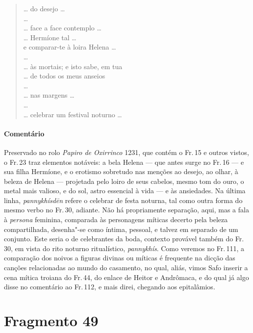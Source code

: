 \begin{verse}
\ldots{} do desejo \ldots{}\\
\ldots{}\\
\ldots{} face a face contemplo \ldots{}\\
\ldots{} Hermíone tal \ldots{}\\
e comparar-te à loira Helena \ldots{}\\
\ldots{}\\
\ldots{} às mortais; e isto sabe, em tua\\
\ldots{} de todos os meus anseios\\
\ldots{}\\
\ldots{} nas margens \ldots{}\\
\ldots{}\\
\ldots{} celebrar um festival noturno \ldots{} 
\end{verse}



{\paragraph{Comentário} Preservado no rolo \emph{Papiro de Oxirrinco} 1231, que contém o Fr.\,15 e outros vistos, o Fr.\,23 traz elementos notáveis: a bela Helena --- que antes surge no Fr.\,16 --- e sua filha Hermíone, e o erotismo sobretudo nas menções ao desejo, ao olhar, à beleza de Helena --- projetada pelo loiro de seus cabelos, mesmo tom do ouro, o metal mais valioso, e do sol, astro essencial à vida --- e às ansiedades. Na última linha, \emph{pannykhísdēn} refere o celebrar de festa noturna, tal como outra forma do mesmo verbo no Fr.\,30, adiante. Não há propriamente separação, aqui, mas a fala à \emph{persona} feminina, comparada às personagens míticas decerto pela beleza compartilhada, desenha"-se como íntima, pessoal, e talvez em separado de um conjunto. Este seria o de celebrantes da boda, contexto provável também do Fr.\,30, em vista do rito noturno ritualístico, \emph{pannykhís}. Como veremos no Fr.\,111, a comparação dos noivos a figuras divinas ou míticas é frequente na dicção das canções relacionadas ao mundo do casamento, no qual, aliás, vimos Safo inserir a cena mítica troiana do Fr.\,44, do enlace de Heitor e Andrômaca, e do qual já algo disse no comentário ao Fr.\,112, e mais direi, chegando aos epitalâmios.}


\section{Fragmento 49}

